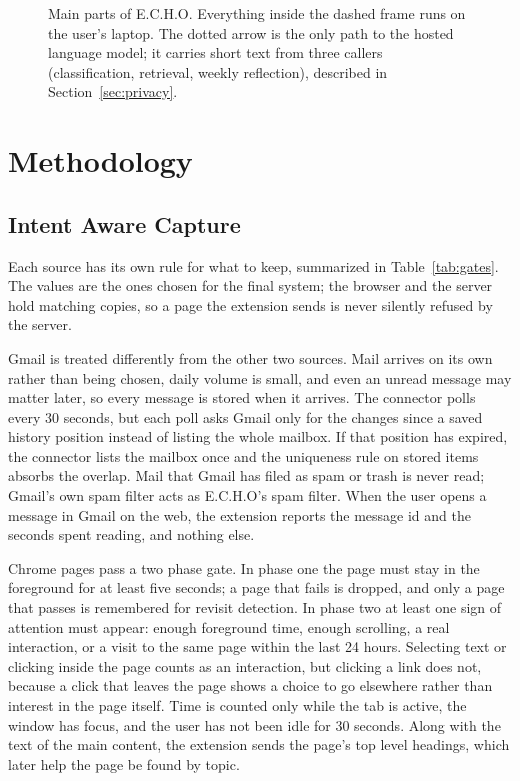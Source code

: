 \documentclass[conference]{IEEEtran}
\begin{document}
\begin{figure}[t]
\caption{Main parts of E.C.H.O. Everything inside the dashed frame runs on the user's laptop. The dotted arrow is the only path to the hosted language model; it carries short text from three callers (classification, retrieval, weekly reflection), described in Section~\ref{sec:privacy}.}
\label{fig:arch}
\end{figure}

\section{Methodology}\label{sec:method}
\subsection{Intent Aware Capture}
Each source has its own rule for what to keep, summarized in Table~\ref{tab:gates}. The values are the ones chosen for the final system; the browser and the server hold matching copies, so a page the extension sends is never silently refused by the server.

Gmail is treated differently from the other two sources. Mail arrives on its own rather than being chosen, daily volume is small, and even an unread message may matter later, so every message is stored when it arrives. The connector polls every 30 seconds, but each poll asks Gmail only for the changes since a saved history position instead of listing the whole mailbox. If that position has expired, the connector lists the mailbox once and the uniqueness rule on stored items absorbs the overlap. Mail that Gmail has filed as spam or trash is never read; Gmail's own spam filter acts as E.C.H.O's spam filter. When the user opens a message in Gmail on the web, the extension reports the message id and the seconds spent reading, and nothing else.

Chrome pages pass a two phase gate. In phase one the page must stay in the foreground for at least five seconds; a page that fails is dropped, and only a page that passes is remembered for revisit detection. In phase two at least one sign of attention must appear: enough foreground time, enough scrolling, a real interaction, or a visit to the same page within the last 24 hours. Selecting text or clicking inside the page counts as an interaction, but clicking a link does not, because a click that leaves the page shows a choice to go elsewhere rather than interest in the page itself. Time is counted only while the tab is active, the window has focus, and the user has not been idle for 30 seconds. Along with the text of the main content, the extension sends the page's top level headings, which later help the page be found by topic.
\end{document}
